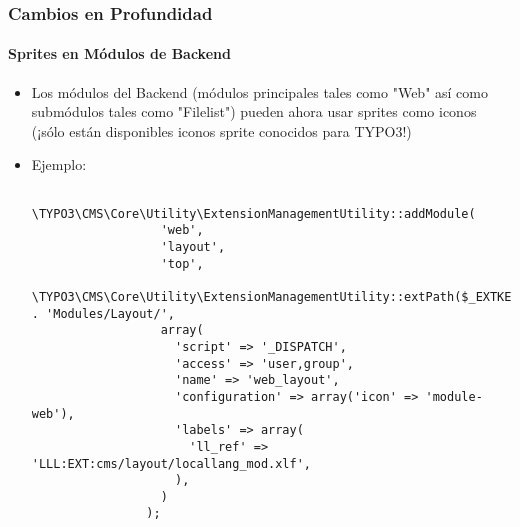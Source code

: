 \begin{frame}[fragile]
	\frametitle{Cambios en Profundidad}
	\framesubtitle{Sprites en Módulos de Backend}

	\lstset{basicstyle=\tiny\ttfamily}

	\begin{itemize}

		\item Los módulos del Backend (módulos principales tales como "Web" así como submódulos tales como
			"Filelist") pueden ahora usar sprites como iconos \small(¡sólo están disponibles iconos sprite conocidos para TYPO3!)
			\normalsize

		\item Ejemplo:

			\begin{lstlisting}
				\TYPO3\CMS\Core\Utility\ExtensionManagementUtility::addModule(
				  'web',
				  'layout',
				  'top',
				  \TYPO3\CMS\Core\Utility\ExtensionManagementUtility::extPath($_EXTKEY) . 'Modules/Layout/',
				  array(
				    'script' => '_DISPATCH',
				    'access' => 'user,group',
				    'name' => 'web_layout',
				    'configuration' => array('icon' => 'module-web'),
				    'labels' => array(
				      'll_ref' => 'LLL:EXT:cms/layout/locallang_mod.xlf',
				    ),
				  )
				);
			\end{lstlisting}

	\end{itemize}

\end{frame}


